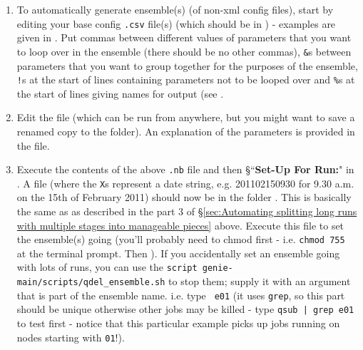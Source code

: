 \documentclass[10pt,a4paper, onecolumn]{article}
\begin{document}
\begin{enumerate}

\item To automatically generate ensemble(s) (of non-xml config files), start by editing your base config \texttt{.csv} file(s) (which should be in \texttt{}) -  examples are given in \texttt{}. Put commas between different values of parameters that you want to loop over in the ensemble (there should be no other commas), \texttt{\&}s between parameters that you want to group together for the purposes of the ensemble, \texttt{!}s at the start of lines containing parameters not to be looped over and \texttt{\%}s at the start of lines giving names for output (see \texttt{}.

\item Edit the file \texttt{} (which can be run from anywhere, but you might want to save a renamed copy to the \texttt{} folder). An explanation of the parameters is provided in the file.

\item Execute the contents of the above \texttt{.nb} file and then \S ``\textbf{Set-Up For Run:}"  in \texttt{}. A file \texttt{} (where the \texttt{X}s represent a date string, e.g. 201102150930 for 9.30 a.m. on the 15th of February 2011) should now be in the folder \texttt{}. This is basically the same as \texttt{} as described in the part 3 of \S\ref{sec:Automating splitting long runs with multiple stages into manageable pieces} above. Execute this file to set the ensemble(s) going (you'll probably need to chmod first - i.e. \texttt{chmod 755 } at the terminal prompt. Then \texttt{}). If you accidentally set an ensemble going with lots of runs, you can use the \texttt{script genie-main/scripts/qdel\_ensemble.sh} to stop them; supply it with an argument that is part of the ensemble name. i.e. type \texttt{ e01} (it uses \texttt{grep}, so this part should be unique otherwise other jobs may be killed - type \texttt{qsub | grep e01} to test first - notice that this particular example picks up jobs running on nodes starting with \texttt{01}!).


\end{enumerate}
\end{document}
